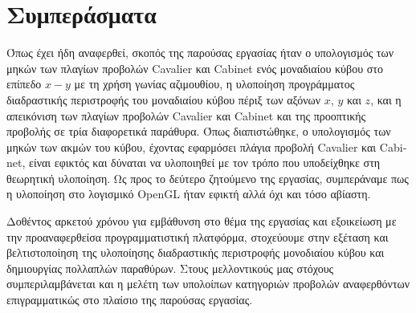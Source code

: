 
\chapter*{Συμπεράσματα}

Όπως έχει ήδη αναφερθεί, σκοπός της παρούσας εργασίας ήταν ο υπολογισμός των μηκών των πλαγίων προβολών \textlatin{Cavalier} και \textlatin{Cabinet} ενός μοναδιαίου κύβου στο επίπεδο $x-y$ με τη χρήση γωνίας αζιμουθίου, η υλοποίηση προγράμματος διαδραστικής περιστροφής του μοναδιαίου κύβου πέριξ των αξόνων $x$, $y$ και $z$, και η απεικόνιση των πλαγίων προβολών \textlatin{Cavalier} και \textlatin{Cabinet} και της προοπτικής προβολής σε τρία διαφορετικά παράθυρα. Όπως διαπιστώθηκε, ο υπολογισμός των μηκών των ακμών του κύβου, έχοντας εφαρμόσει πλάγια προβολή \textlatin{Cavalier} και \textlatin{Cabinet}, είναι εφικτός και δύναται να υλοποιηθεί με τον τρόπο που υποδείχθηκε στη θεωρητική υλοποίηση. Ως προς το δεύτερο ζητούμενο της εργασίας, συμπεράναμε πως η υλοποίηση στο λογισμικό \textlatin{OpenGL} ήταν εφικτή αλλά όχι και τόσο αβίαστη. \par

Δοθέντος αρκετού χρόνου για εμβάθυνση στο θέμα της εργασίας και εξοικείωση με την προαναφερθείσα προγραμματιστική πλατφόρμα, στοχεύουμε στην εξέταση και βελτιστοποίηση της υλοποίησης διαδραστικής περιστροφής μονοδιαίου κύβου και δημιουργίας πολλαπλών παραθύρων. Στους μελλοντικούς μας στόχους συμπεριλαμβάνεται και η μελέτη των υπολοίπων κατηγοριών προβολών αναφερθόντων επιγραμματικώς στο πλαίσιο της παρούσας εργασίας.
